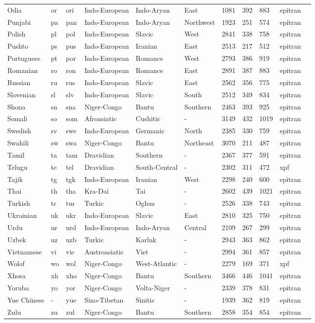\begin{longtable}{lllllllllll}
Odia & or & ori & Indo-European & Indo-Aryan & East & 1081 & 392 & 883 & epitran \\
Punjabi & pa & pan & Indo-European & Indo-Aryan & Northwest & 1923 & 251 & 574 & epitran \\
Polish & pl & pol & Indo-European & Slavic & West & 2841 & 338 & 758 & epitran \\
Pushto & ps & pus & Indo-European & Iranian & East & 2513 & 217 & 512 & epitran \\
Portuguese & pt & por & Indo-European & Romance & West & 2793 & 386 & 919 & epitran \\
Romanian & ro & ron & Indo-European & Romance & East & 2891 & 387 & 883 & epitran \\
Russian & ru & rus & Indo-European & Slavic & East & 2562 & 356 & 775 & epitran \\
Slovenian & sl & slv & Indo-European & Slavic & South & 2512 & 349 & 834 & epitran \\
Shona & sn & sna & Niger-Congo & Bantu & Southern & 2463 & 393 & 925 & epitran \\
Somali & so & som & Afroasiatic & Cushitic & - & 3149 & 432 & 1019 & epitran \\
Swedish & sv & swe & Indo-European & Germanic & North & 2385 & 330 & 759 & epitran \\
Swahili & sw & swa & Niger-Congo & Bantu & Northeast & 3070 & 211 & 487 & epitran \\
Tamil & ta & tam & Dravidian & Southern & - & 2367 & 377 & 591 & epitran \\
Telugu & te & tel & Dravidian & South-Central & - & 2302 & 311 & 472 & xpf \\
Tajik & tg & tgk & Indo-European & Iranian & West & 2298 & 240 & 600 & epitran \\
Thai & th & tha & Kra-Dai & Tai & - & 2602 & 439 & 1021 & epitran \\
Turkish & tr & tur & Turkic & Oghuz & - & 2526 & 338 & 743 & epitran \\
Ukrainian & uk & ukr & Indo-European & Slavic & East & 2810 & 325 & 750 & epitran \\
Urdu & ur & urd & Indo-European & Indo-Aryan & Central & 2109 & 267 & 299 & epitran \\
Uzbek & uz & uzb & Turkic & Karluk & - & 2943 & 363 & 862 & epitran \\
Vietnamese & vi & vie & Austroasiatic & Viet & - & 2994 & 361 & 857 & epitran \\
Wolof & wo & wol & Niger-Congo & West-Atlantic & - & 2279 & 169 & 371 & xpf \\
Xhosa & xh & xho & Niger-Congo & Bantu & Southern & 3466 & 446 & 1041 & epitran \\
Yoruba & yo & yor & Niger-Congo & Volta-Niger & - & 2339 & 378 & 831 & epitran \\
Yue Chinese & - & yue & Sino-Tibetan & Sinitic & - & 1939 & 362 & 819 & epitran \\
Zulu & zu & zul & Niger-Congo & Bantu & Southern & 2858 & 354 & 854 & epitran \\
\end{longtable}
\endgroup